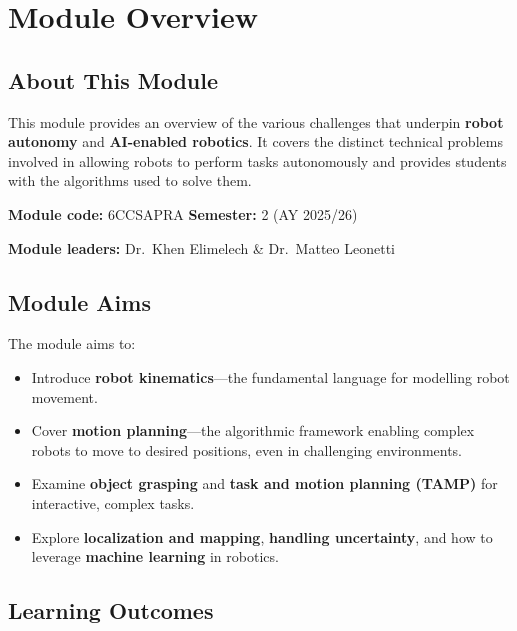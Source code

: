 \section*{Module Overview}

\subsection*{About This Module}

This module provides an overview of the various challenges that underpin \textbf{robot autonomy} and \textbf{AI-enabled robotics}. It covers the distinct technical problems involved in allowing robots to perform tasks autonomously and provides students with the algorithms used to solve them.

\textbf{Module code:} 6CCSAPRA \hfill \textbf{Semester:} 2 (AY 2025/26)

\textbf{Module leaders:} Dr.\ Khen Elimelech \& Dr.\ Matteo Leonetti

\bigseparator

\subsection*{Module Aims}

The module aims to:
\begin{itemize}
  \item Introduce \textbf{robot kinematics}---the fundamental language for modelling robot movement.
  \item Cover \textbf{motion planning}---the algorithmic framework enabling complex robots to move to desired positions, even in challenging environments.
  \item Examine \textbf{object grasping} and \textbf{task and motion planning (TAMP)} for interactive, complex tasks.
  \item Explore \textbf{localization and mapping}, \textbf{handling uncertainty}, and how to leverage \textbf{machine learning} in robotics.
\end{itemize}

\bigseparator

\subsection*{Learning Outcomes}

